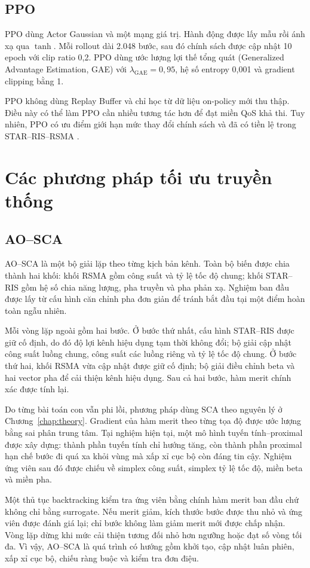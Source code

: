 \subsection{PPO}
PPO dùng Actor Gaussian và một mạng giá trị. Hành động được lấy mẫu rồi ánh xạ qua $\tanh$. Mỗi rollout dài 2.048 bước, sau đó chính sách được cập nhật 10 epoch với clip ratio 0,2. PPO dùng ước lượng lợi thế tổng quát (Generalized Advantage Estimation, GAE) với $\lambda_{\mathrm{GAE}}=0{,}95$, hệ số entropy 0,001 và gradient clipping bằng 1.

PPO không dùng Replay Buffer và chỉ học từ dữ liệu on-policy mới thu thập. Điều này có thể làm PPO cần nhiều tương tác hơn để đạt miền QoS khả thi. Tuy nhiên, PPO có ưu điểm giới hạn mức thay đổi chính sách và đã có tiền lệ trong STAR--RIS--RSMA \cite{Meng2024PPOSTARRSMA}.

\section{Các phương pháp tối ưu truyền thống}
\subsection{AO--SCA}
AO--SCA là một bộ giải lặp theo từng kịch bản kênh. Toàn bộ biến được chia thành hai khối: khối RSMA gồm công suất và tỷ lệ tốc độ chung; khối STAR--RIS gồm hệ số chia năng lượng, pha truyền và pha phản xạ. Nghiệm ban đầu được lấy từ cấu hình căn chỉnh pha đơn giản để tránh bắt đầu tại một điểm hoàn toàn ngẫu nhiên.

Mỗi vòng lặp ngoài gồm hai bước. Ở bước thứ nhất, cấu hình STAR--RIS được giữ cố định, do đó độ lợi kênh hiệu dụng tạm thời không đổi; bộ giải cập nhật công suất luồng chung, công suất các luồng riêng và tỷ lệ tốc độ chung. Ở bước thứ hai, khối RSMA vừa cập nhật được giữ cố định; bộ giải điều chỉnh beta và hai vector pha để cải thiện kênh hiệu dụng. Sau cả hai bước, hàm merit chính xác được tính lại.

Do từng bài toán con vẫn phi lồi, phương pháp dùng SCA theo nguyên lý ở Chương~\ref{chap:theory}. Gradient của hàm merit theo từng tọa độ được ước lượng bằng sai phân trung tâm. Tại nghiệm hiện tại, một mô hình tuyến tính--proximal được xây dựng: thành phần tuyến tính chỉ hướng tăng, còn thành phần proximal hạn chế bước đi quá xa khỏi vùng mà xấp xỉ cục bộ còn đáng tin cậy. Nghiệm ứng viên sau đó được chiếu về simplex công suất, simplex tỷ lệ tốc độ, miền beta và miền pha.

Một thủ tục backtracking kiểm tra ứng viên bằng chính hàm merit ban đầu chứ không chỉ bằng surrogate. Nếu merit giảm, kích thước bước được thu nhỏ và ứng viên được đánh giá lại; chỉ bước không làm giảm merit mới được chấp nhận. Vòng lặp dừng khi mức cải thiện tương đối nhỏ hơn ngưỡng hoặc đạt số vòng tối đa. Vì vậy, AO--SCA là quá trình có hướng gồm khởi tạo, cập nhật luân phiên, xấp xỉ cục bộ, chiếu ràng buộc và kiểm tra đơn điệu.

